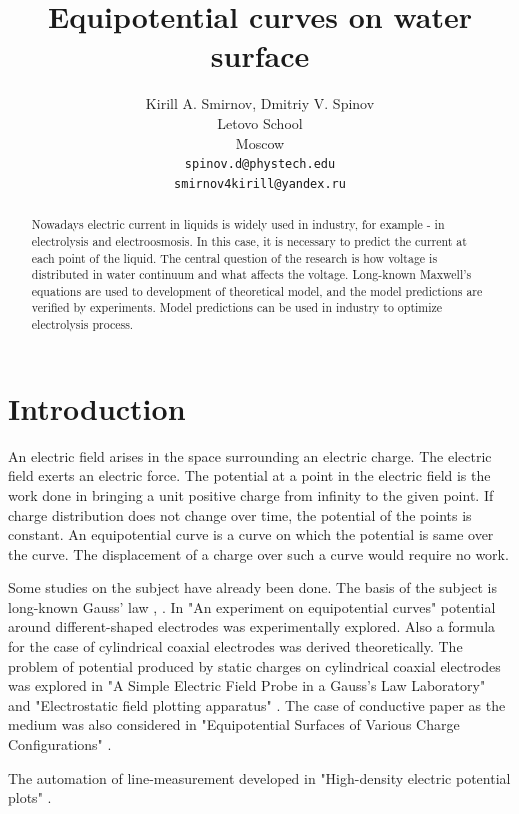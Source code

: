 \documentclass{article}
\title{Equipotential curves on water surface}
\author{
  Kirill A. Smirnov, Dmitriy V. Spinov \\
  Letovo School \\
  Moscow\\
  \texttt{spinov.d@phystech.edu} \\
  \texttt{smirnov4kirill@yandex.ru} \\
}
\begin{document}
\maketitle


\begin{abstract}
Nowadays electric current in liquids is widely used in industry, for example - in electrolysis and electroosmosis. In this case, it is necessary to predict the current at each point of the liquid. The central question of the research is how voltage is distributed in water continuum and what affects the voltage. Long-known Maxwell's equations are used to development of theoretical model, and the model predictions are verified by experiments. Model predictions can be used in industry to optimize electrolysis process.
\end{abstract}


\section{Introduction}            %
An electric field arises in the space surrounding an electric charge. The electric field exerts an electric force. The potential at a point in the electric field is the work done in bringing a unit positive charge from infinity to the given point. If charge distribution does not change over time, the potential of the points is constant. An equipotential curve is a curve on which the potential is same over the curve. The displacement of a charge over such a curve would require no work.\par

Some studies on the subject have already been done. The basis of the subject is long-known Gauss' law \cite{gauss}, \cite{landavshic}. In "An experiment on equipotential curves"\cite{khaparde} potential around different-shaped electrodes was experimentally explored. Also a formula for the case of cylindrical coaxial electrodes was derived theoretically. The problem of potential produced by static charges on cylindrical coaxial electrodes was explored in "A Simple Electric Field Probe in a Gauss's Law Laboratory"\cite{ludwigsen} and "Electrostatic field plotting apparatus" \cite{smith}. The case of conductive paper as the medium was also considered in "Equipotential Surfaces of Various Charge Configurations" \cite{beyond}.

The automation of line-measurement developed in "High-density electric potential plots" \cite{binder2015high}.
\end{document}
